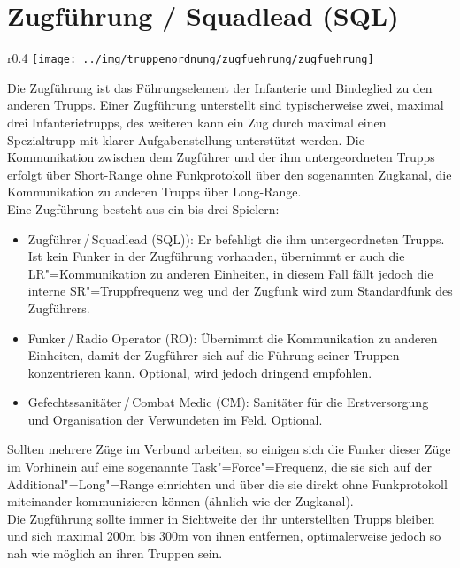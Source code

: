 \section{Zugführung / Squadlead (SQL)}
\begin{wrapfigure}{r}{0.4\textwidth}
	\centering 
	\vspace{-20pt}
	\texttt{[image: ../img/truppenordnung/zugfuehrung/zugfuehrung]}
	\vspace{-50pt}
\end{wrapfigure}
Die Zugführung ist das Führungselement der Infanterie und Bindeglied zu den anderen Trupps. Einer Zugführung unterstellt sind typischerweise zwei, maximal drei Infanterietrupps, des weiteren kann ein Zug durch maximal einen Spezialtrupp mit klarer Aufgabenstellung unterstützt werden. Die Kommunikation zwischen dem Zugführer und der ihm untergeordneten Trupps erfolgt über Short-Range ohne Funkprotokoll über den sogenannten Zugkanal, die Kommunikation zu anderen Trupps über Long-Range.\\

Eine Zugführung besteht aus ein bis drei Spielern:
\begin{itemize}
	\item Zugführer\,/\,Squadlead (SQL)): Er befehligt die ihm untergeordneten Trupps. Ist kein Funker in der Zugführung vorhanden, übernimmt er auch die LR"=Kommunikation zu anderen Einheiten, in diesem Fall fällt jedoch die interne SR"=Truppfrequenz weg und der Zugfunk wird zum Standardfunk des Zugführers.
	\item Funker\,/\,Radio Operator (RO): Übernimmt die Kommunikation zu anderen Einheiten, damit der Zugführer sich auf die Führung seiner Truppen konzentrieren kann. Optional, wird jedoch dringend empfohlen.
	\item Gefechtssanitäter\,/\,Combat Medic (CM): Sanitäter für die Erstversorgung und Organisation der Verwundeten im Feld. Optional.
\end{itemize}
Sollten mehrere Züge im Verbund arbeiten, so einigen sich die Funker dieser Züge im Vorhinein auf eine sogenannte Task"=Force"=Frequenz, die sie sich auf der Additional"=Long"=Range einrichten und über die sie direkt ohne Funkprotokoll miteinander kommunizieren können (ähnlich wie der Zugkanal).\\
Die Zugführung sollte immer in Sichtweite der ihr unterstellten Trupps bleiben und sich maximal 200m bis 300m von ihnen entfernen, optimalerweise jedoch so nah wie möglich an ihren Truppen sein.